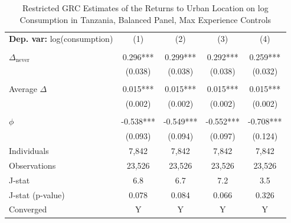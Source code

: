 \begin{table}[htbp] \centering \begin{threeparttable}
 \caption{Restricted GRC Estimates of the Returns to Urban Location on log Consumption in Tanzania, Balanced Panel, Max Experience Controls} 
 \label{tab:GRC_TZA_consumption_urban_bal_exp_max} 
\begin{tabular}{l cccc} \toprule  \textbf{Dep. var:}  log(consumption) 
                    &\multicolumn{1}{c}{(1)}   &\multicolumn{1}{c}{(2)}   &\multicolumn{1}{c}{(3)}   &\multicolumn{1}{c}{(4)}   \\
                    &               &               &               &               \\
\addlinespace
$\Delta_{\text{never}}$&       0.296***&       0.299***&       0.292***&       0.259***\\
                    &     (0.038)   &     (0.038)   &     (0.038)   &     (0.032)   \\
                    &               &               &               &               \\
\addlinespace
Average $\Delta$    &       0.015***&       0.015***&       0.015***&       0.015***\\
                    &     (0.002)   &     (0.002)   &     (0.002)   &     (0.002)   \\
                    &               &               &               &               \\
\addlinespace
$\phi$              &      -0.538***&      -0.549***&      -0.552***&      -0.708***\\
                    &     (0.093)   &     (0.094)   &     (0.097)   &     (0.124)   \\
\addlinespace
Individuals         &       7,842   &       7,842   &       7,842   &       7,842   \\
Observations        &      23,526   &      23,526   &      23,526   &      23,526   \\
J-stat              &         6.8   &         6.7   &         7.2   &         3.5   \\
J-stat (p-value)    &       0.078   &       0.084   &       0.066   &       0.326   \\
Converged           &           Y   &           Y   &           Y   &           Y   \\

\end{tabular}
\end{threeparttable}
\end{table}
